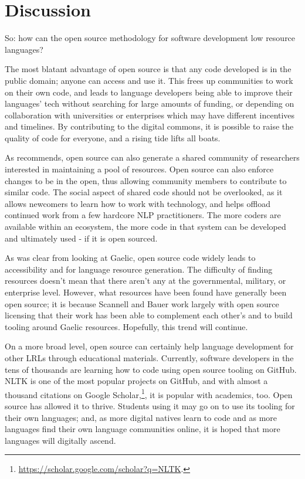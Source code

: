 \section{Discussion}
\label{sec:discussion}

So: how can the open source methodology for software development low resource languages?

The most blatant advantage of open source is that any code developed is in the public domain; anyone can access and use it. This frees up communities to work on their own code, and leads to language developers being able to improve their languages' tech without searching for large amounts of funding, or depending on collaboration with universities or enterprises which may have different incentives and timelines. By contributing to the digital commons, it is possible to raise the quality of code for everyone, and a rising tide lifts all boats.

As \citet{streiter2006implementing} recommends, open source can also generate a shared community of researchers interested in maintaining a pool of resources. Open source can also enforce changes to be in the open, thus allowing community members to contribute to similar code. The social aspect of shared code should not be overlooked, as it allows newcomers to learn how to work with technology, and helps offload continued work from a few hardcore NLP practitioners. The more coders are available within an ecosystem, the more code in that system can be developed and ultimately used - if it is open sourced.

As was clear from looking at Gaelic, open source code widely leads to accessibility and for language resource generation. The difficulty of finding resources doesn't mean that there aren't any at the governmental, military, or enterprise level. However, what resources have been found have generally been open source; it is because Scannell and Bauer work largely with open source licensing that their work has been able to complement each other's and to build tooling around Gaelic resources. Hopefully, this trend will continue.

On a more broad level, open source can certainly help language development for other LRLs through educational materials. Currently, software developers in the tens of thousands are learning how to code using open source tooling on GitHub. NLTK is one of the most popular projects on GitHub, and with almost a thousand citations on Google Scholar,\footnote{\href{https://scholar.google.com/scholar?q=NLTK}{https://scholar.google.com/scholar?q=NLTK}. }, it is popular with academics, too. Open source has allowed it to thrive. Students using it may go on to use its tooling for their own languages; and, as more digital natives learn to code and as more languages find their own language communities online, it is hoped that more languages will digitally ascend.

